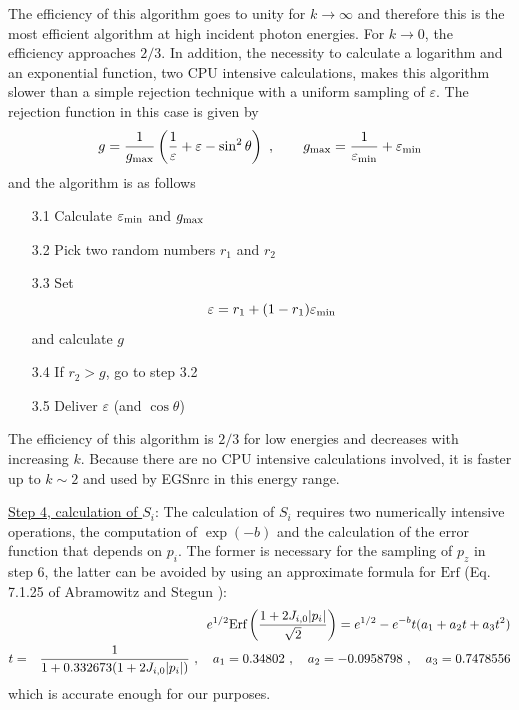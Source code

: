 The efficiency of this algorithm
goes to unity for $k \to \infty$ and therefore this is
the most efficient algorithm at high incident photon energies.
For $k \to 0$, the efficiency approaches $2/3$. In addition,
the necessity to calculate a logarithm and an exponential function,
two CPU intensive calculations, makes this algorithm slower than
a simple rejection technique with a uniform sampling of $\varepsilon$.
The rejection function in this case is given by
\begin{equation}
g = \frac{1}{g_{\rm max}} \left( {1 \over \varepsilon} + \varepsilon -
\sin^2 \theta \right)~, \quad \quad g_{\rm max} =
{1 \over \varepsilon_{\rm min}} + \varepsilon_{\rm min}
\end{equation}
and the algorithm is as follows
\begin{itemize}
\item[3.1]
Calculate $\varepsilon_{\rm min}$ and $g_{\rm max}$
\item[3.2]
Pick two random numbers $r_1$ and $r_2$
\item[3.3]
Set
\begin{equation}
\varepsilon = r_1 + (1 - r_1) \varepsilon_{\rm min}
\end{equation}
and calculate $g$
\item[3.4]
If $r_2 > g$, go to step 3.2
\item[3.5]
Deliver $\varepsilon$ (and $\cos \theta$)
\end{itemize}
The efficiency of this algorithm is $2/3$ for low energies and
decreases with increasing $k$. Because there are no CPU intensive
calculations involved, it is faster up to $k \sim 2$ and
used by EGSnrc in this energy range.

\underline{Step 4, calculation of $S_i$}: The calculation of
$S_i$ requires two numerically intensive operations, the
computation of $\exp(-b)$ and the calculation of the error
function that depends on $p_i$. The former is necessary for
the sampling of $p_z$ in step 6, the latter can be avoided
by using an approximate formula for $\mbox{Erf}$
(Eq. 7.1.25 of Abramowitz and Stegun \cite{AS64}):
\begin{eqnarray}
& & e^{1/2} \mbox{Erf} \left( { 1 + 2 J_{i,0} |p_i| \over \sqrt{2} } \right)
= e^{1/2} - e^{-b} t (a_1 + a_2 t + a_3 t^2 ) \\
t & = & {1 \over 1 + 0.332673 (1 + 2 J_{i,0} |p_i|)}~, \quad a_1 = 0.34802~,
\quad a_2 = -0.0958798~, \quad a_3 = 0.7478556 \nonumber
\end{eqnarray}
which is accurate enough for our purposes.

